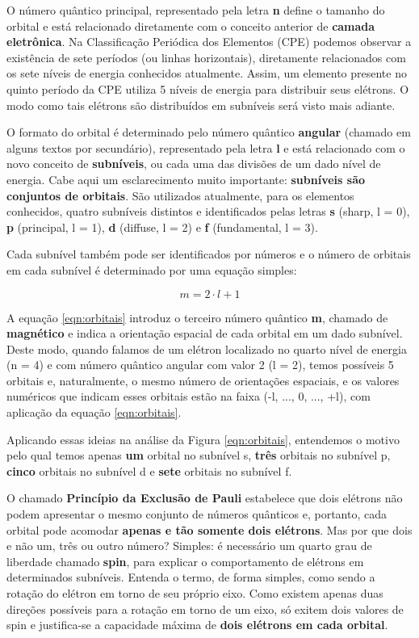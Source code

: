 O número quântico principal, representado pela letra \textbf{n} define o tamanho do orbital e está relacionado diretamente com o conceito anterior de \textbf{camada eletrônica}. Na Classificação Periódica dos Elementos (CPE) podemos observar a existência de sete períodos (ou linhas horizontais), diretamente relacionados com os sete níveis de energia conhecidos atualmente. Assim, um elemento presente no quinto período da CPE utiliza 5 níveis de energia para distribuir seus elétrons. O modo como tais elétrons são distribuídos em subníveis será visto mais adiante.

O formato do orbital é determinado pelo número quântico \textbf{angular} (chamado em alguns textos por secundário), representado pela letra \textbf{l} e está relacionado com o novo conceito de \textbf{subníveis}, ou cada uma das divisões de um dado nível de energia. Cabe aqui um esclarecimento muito importante: \textbf{subníveis são conjuntos de orbitais}. São utilizados atualmente, para os elementos conhecidos, quatro subníveis distintos e identificados pelas letras \textbf{s} (sharp, l = 0), \textbf{p} (principal, l = 1), \textbf{d} (diffuse, l = 2) e \textbf{f} (fundamental, l = 3).

Cada subnível também pode ser identificados por números e o número de orbitais em cada subnível é determinado por uma equação simples:

\begin{equation}
    m = 2\cdot l+1
    \label{eqn:orbitais}
\end{equation}

A equação \ref{eqn:orbitais} introduz o terceiro número quântico \textbf{m}, chamado de \textbf{magnético} e indica a orientação espacial de cada orbital em um dado subnível. Deste modo, quando falamos de um elétron localizado no quarto nível de energia (n = 4) e com número quântico angular com valor 2 (l = 2), temos possíveis 5 orbitais e, naturalmente, o mesmo número de orientações espaciais, e os valores numéricos que indicam esses orbitais estão na faixa (-l, ..., 0, ..., +l), com aplicação da equação \ref{eqn:orbitais}.

Aplicando essas ideias na análise da Figura \ref{eqn:orbitais}, entendemos o motivo pelo qual temos apenas \textbf{um} orbital no subnível s, \textbf{três} orbitais no subnível p, \textbf{cinco} orbitais no subnível d e \textbf{sete} orbitais no subnível f.

O chamado \textbf{Princípio da Exclusão de Pauli} \cite{massimi2005pauli} estabelece que dois elétrons não podem apresentar o mesmo conjunto de números quânticos e, portanto, cada orbital pode acomodar \textbf{apenas e tão somente dois elétrons}. Mas por que dois e não um, três ou outro número? Simples: é necessário um quarto grau de liberdade chamado \textbf{spin}, para explicar o comportamento de elétrons em determinados subníveis. Entenda o termo, de forma simples, como sendo a rotação do elétron em torno de seu próprio eixo. Como existem apenas duas direções possíveis para a rotação em torno de um eixo, só exitem dois valores de spin e justifica-se a capacidade máxima de \textbf{dois elétrons em cada orbital}.

